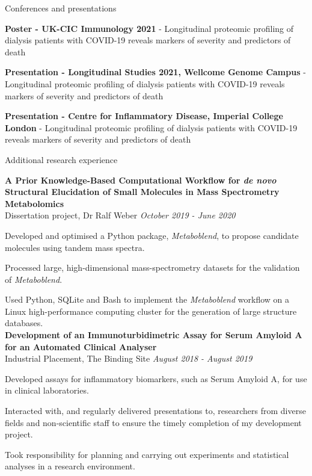 \documentclass{resume}
\begin{document}
\begin{rSection}{Conferences and presentations}

\item \textbf{Poster - UK-CIC Immunology 2021} - Longitudinal proteomic profiling of dialysis patients with COVID-19 reveals markers of severity and predictors of death

\item \textbf{Presentation - Longitudinal Studies 2021, Wellcome Genome Campus} - Longitudinal proteomic profiling of dialysis patients with COVID-19 reveals markers of severity and predictors of death

\item \textbf{Presentation - Centre for Inflammatory Disease, Imperial College London} - Longitudinal proteomic profiling of dialysis patients with COVID-19 reveals markers of severity and predictors of death

\end{rSection}

\begin{rSection}{Additional research experience}

\textbf{A Prior Knowledge-Based Computational Workflow for \textit{de novo} Structural Elucidation of Small Molecules in Mass Spectrometry Metabolomics} \\
Dissertation project, Dr Ralf Weber \hfill  \textit{October 2019 - June 2020}

\smallskip
\item Developed and optimised a Python package, \textit{Metaboblend}, to propose candidate molecules using tandem mass spectra. 
\item Processed large, high-dimensional mass-spectrometry datasets for the validation of \textit{Metaboblend}. 
\item Used Python, SQLite and Bash to implement the \textit{Metaboblend} workflow on a Linux high-performance computing cluster for the generation of large structure databases. \\

\textbf{Development of an Immunoturbidimetric Assay for Serum Amyloid A for an Automated Clinical Analyser} \\
Industrial Placement, The Binding Site \hfill  \textit{August 2018 - August 2019}

\smallskip
\item Developed assays for inflammatory biomarkers, such as Serum Amyloid A, for use in clinical laboratories.
\item Interacted with, and regularly delivered presentations to, researchers from diverse fields and non-scientific staff to ensure the timely completion of my development project. 
\item Took responsibility for planning and carrying out experiments and statistical analyses in a research environment.

\end{rSection}
\end{document}

